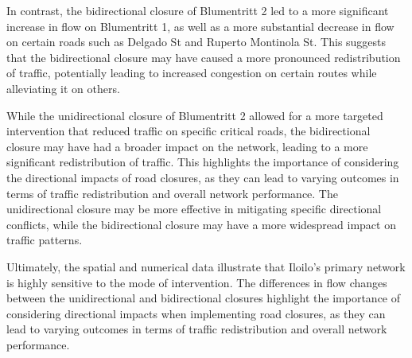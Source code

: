 \begin{table}[H]
    \centering
    \renewcommand{\thetable}{4.11b}
    \caption{Top 5 Roads With Decrease in Flow After Bidirectional Closure of Blumentritt 2}
    \label{tab:5.11b}
\end{table}

In contrast, the bidirectional closure of Blumentritt 2 led to a more significant increase in flow on Blumentritt 1, as well as a more substantial decrease in flow on certain roads such as Delgado St and Ruperto Montinola St. This suggests that the bidirectional closure may have caused a more pronounced redistribution of traffic, potentially leading to increased congestion on certain routes while alleviating it on others. 

While the unidirectional closure of Blumentritt 2 allowed for a more targeted intervention that reduced traffic on specific critical roads, the bidirectional closure may have had a broader impact on the network, leading to a more significant redistribution of traffic. This highlights the importance of considering the directional impacts of road closures, as they can lead to varying outcomes in terms of traffic redistribution and overall network performance. The unidirectional closure may be more effective in mitigating specific directional conflicts, while the bidirectional closure may have a more widespread impact on traffic patterns.

Ultimately, the spatial and numerical data illustrate that Iloilo's primary network is highly sensitive to the mode of intervention. The differences in flow changes between the unidirectional and bidirectional closures highlight the importance of considering directional impacts when implementing road closures, as they can lead to varying outcomes in terms of traffic redistribution and overall network performance.


